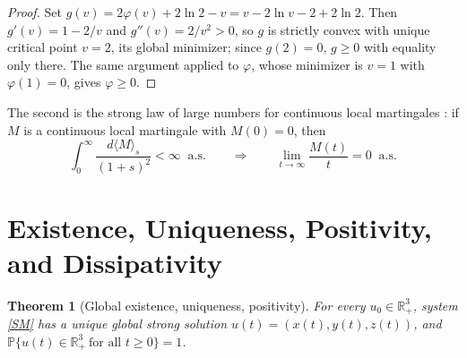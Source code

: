 \documentclass{article}
\newtheorem{theorem}{Theorem}[section]
\begin{document}
\begin{proof}
Set $g(v)=2\varphi(v)+2\ln 2-v=v-2\ln v-2+2\ln 2$. Then $g'(v)=1-2/v$ and $g''(v)=2/v^2>0$, so $g$ is strictly convex with unique critical point $v=2$, its global minimizer; since $g(2)=0$, $g\ge0$ with equality only there. The same argument applied to $\varphi$, whose minimizer is $v=1$ with $\varphi(1)=0$, gives $\varphi\ge0$.
\end{proof}

The second is the strong law of large numbers for continuous local martingales \citep[Thm.~1.3.4]{Ref1}: if $M$ is a continuous local martingale with $M(0)=0$, then
\begin{equation}\label{eq:SLLN}
\int_0^\infty \frac{d\langle M\rangle_s}{(1+s)^2}<\infty \ \text{ a.s.}\qquad\Longrightarrow\qquad \lim_{t\to\infty}\frac{M(t)}{t}=0 \ \text{ a.s.}
\end{equation}

\section{Existence, Uniqueness, Positivity, and Dissipativity}\label{sec:existence}

\begin{theorem}[Global existence, uniqueness, positivity]\label{Existence}
For every $u_0\in\mathbb{R}^3_+$, system \eqref{SM} has a unique global strong solution $u(t)=(x(t),y(t),z(t))$, and $\mathbb{P}\{u(t)\in\mathbb{R}^3_+\ \text{for all } t\ge0\}=1$.
\end{theorem}
\end{document}
